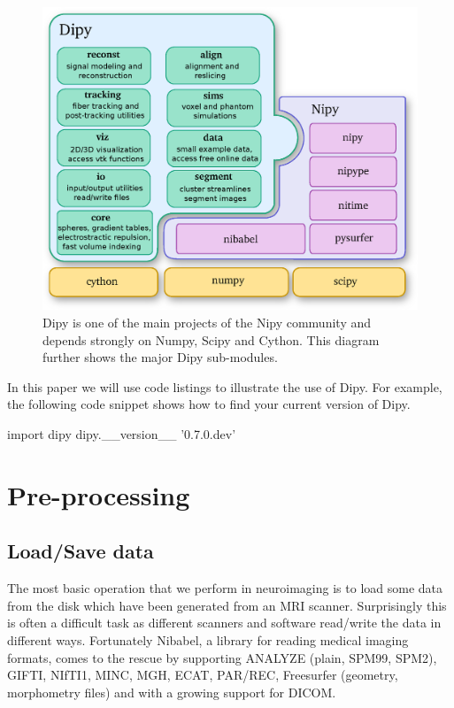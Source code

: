 \documentclass{bioinfo}
\begin{document}
\begin{figure}
\includegraphics[scale=0.42]{Figures/module_structure2.eps}
\centering{}
\caption{Dipy is one of the main projects of the Nipy community and depends strongly
on Numpy, Scipy and Cython. This diagram further shows the major Dipy sub-modules.\label{Fig:module_structure}}
\end{figure}

In this paper we will use code listings to illustrate the use of Dipy. For
example, the following code snippet shows how to find your current version of
Dipy.
\begin{python}
import dipy
dipy.__version__
'0.7.0.dev'
\end{python}

\section{Pre-processing}\label{preprocessing}

\subsection{Load/Save data}\label{loadsave}
The most basic operation that we perform in neuroimaging is to load some data from
the disk which have been generated from an MRI scanner. Surprisingly this is often a
difficult task as different scanners and software read/write the data in
different ways. Fortunately Nibabel, a library for reading medical imaging formats,
comes to the rescue by supporting ANALYZE (plain, SPM99, SPM2), GIFTI,
NIfTI1, MINC, MGH, ECAT, PAR/REC, Freesurfer (geometry, morphometry files) and
with a growing support for DICOM.
\end{document}
